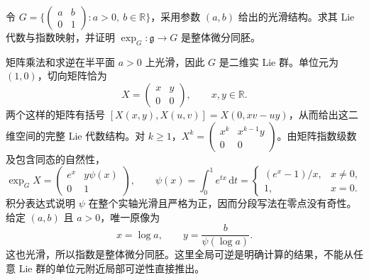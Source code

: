 \begin{exercise}\label{g1:ex:affine-exponential}
	令 \(G=\{\left(\begin{smallmatrix}a&b\\0&1\end{smallmatrix}\right):a>0,\ b\in\mathbb R\}\)，采用参数 \((a,b)\) 给出的光滑结构。求其 Lie 代数与指数映射，并证明 \(\exp_G:\mathfrak g\to G\) 是整体微分同胚。
\end{exercise}
\begin{solution}
	矩阵乘法和求逆在半平面 \(a>0\) 上光滑，因此 \(G\) 是二维实 Lie 群。单位元为 \((1,0)\)，切向矩阵恰为
	\[
		X=\begin{pmatrix}x&y\\0&0\end{pmatrix},\qquad x,y\in\mathbb R.
	\]
	两个这样的矩阵有括号 \([X(x,y),X(u,v)]=X(0,xv-uy)\)，从而给出这二维空间的完整 Lie 代数结构。对 \(k\geq1\)，\(X^k=\left(\begin{smallmatrix}x^k&x^{k-1}y\\0&0\end{smallmatrix}\right)\)。由矩阵指数级数及包含同态的自然性，
	\[
		\exp_GX=\begin{pmatrix}e^x&y\psi(x)\\0&1\end{pmatrix},\qquad
		\psi(x)=\int_0^1e^{tx}\,\mathrm{d}t
		=\begin{cases}(e^x-1)/x,&x\ne0,\\1,&x=0.\end{cases}
	\]
	积分表达式说明 \(\psi\) 在整个实轴光滑且严格为正，因而分段写法在零点没有奇性。给定 \((a,b)\) 且 \(a>0\)，唯一原像为
	\[
		x=\log a,\qquad y=\frac{b}{\psi(\log a)}.
	\]
	这也光滑，所以指数是整体微分同胚。这里全局可逆是明确计算的结果，不能从任意 Lie 群的单位元附近局部可逆性直接推出。
\end{solution}

